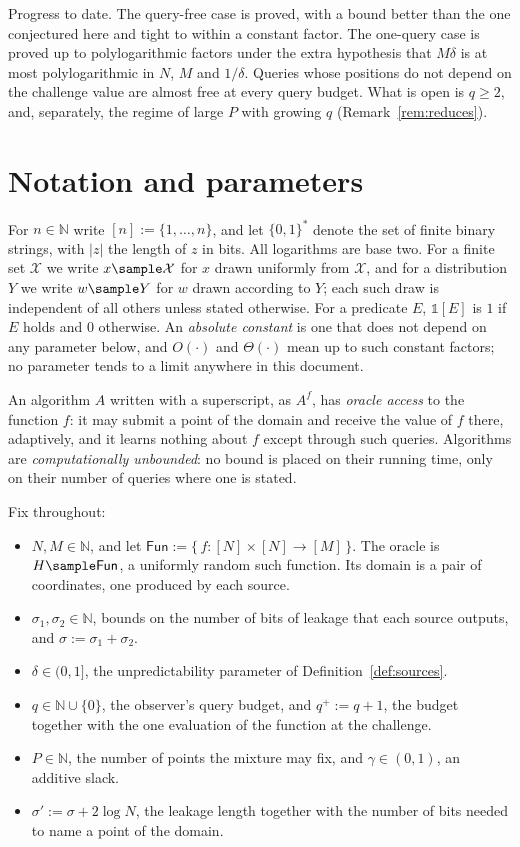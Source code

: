 \documentclass{conjura-conjecture}
\newcommand{\Fun}{\mathsf{Fun}}
\newcommand{\bits}{\{0,1\}}
\newcommand{\ind}{\mathbb{1}}
\begin{document}
Progress to date. The query-free case is proved, with a bound better than
the one conjectured here and tight to within a constant factor. The
one-query case is proved up to polylogarithmic factors under the extra
hypothesis that $M\delta$ is at most polylogarithmic in $N$, $M$ and
$1/\delta$. Queries whose positions do not depend on the challenge value
are almost free at every query budget. What is open is $q \ge 2$, and,
separately, the regime of large $P$ with growing $q$
(Remark~\ref{rem:reduces}).

\section{Notation and parameters}\label{sec:notation}

For $n \in \mathbb{N}$ write $[n] := \{1,\dots,n\}$, and let $\bits^{*}$
denote the set of finite binary strings, with $|z|$ the length of $z$ in
bits. All logarithms are base two. For a finite set $\mathcal{X}$ we write
$x \sample \mathcal{X}$ for $x$ drawn uniformly from $\mathcal{X}$, and for
a distribution $Y$ we write $w \sample Y$ for $w$ drawn according to $Y$;
each such draw is independent of all others unless stated otherwise. For a
predicate $E$, $\ind[E]$ is $1$ if $E$ holds and $0$ otherwise. An
\emph{absolute constant} is one that does not depend on any parameter
below, and $O(\cdot)$ and $\Theta(\cdot)$ mean up to such constant factors;
no parameter tends to a limit anywhere in this document.

An algorithm $A$ written with a superscript, as $A^{f}$, has \emph{oracle
access} to the function $f$: it may submit a point of the domain and
receive the value of $f$ there, adaptively, and it learns nothing about $f$
except through such queries. Algorithms are \emph{computationally
unbounded}: no bound is placed on their running time, only on their number
of queries where one is stated.

Fix throughout:
\begin{itemize}
\item $N, M \in \mathbb{N}$, and let
  $\Fun := \{\, f : [N]\times[N] \to [M] \,\}$. The oracle is
  $H \sample \Fun$, a uniformly random such function. Its domain is a pair
  of coordinates, one produced by each source.
\item $\sigma_1, \sigma_2 \in \mathbb{N}$, bounds on the number of bits of
  leakage that each source outputs, and $\sigma := \sigma_1 + \sigma_2$.
\item $\delta \in (0,1]$, the unpredictability parameter of
  Definition~\ref{def:sources}.
\item $q \in \mathbb{N} \cup \{0\}$, the observer's query budget, and
  $q^{+} := q+1$, the budget together with the one evaluation of the
  function at the challenge.
\item $P \in \mathbb{N}$, the number of points the mixture may fix, and
  $\gamma \in (0,1)$, an additive slack.
\item $\sigma' := \sigma + 2\log N$, the leakage length together with the
  number of bits needed to name a point of the domain.
\end{itemize}
\end{document}
